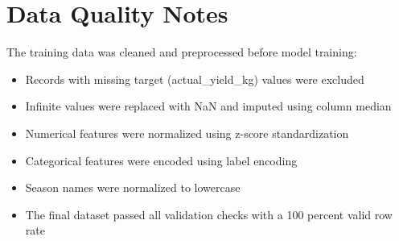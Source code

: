 \section{Data Quality Notes}

The training data was cleaned and preprocessed before model training:
\begin{itemize}
  \item Records with missing target (actual\_yield\_kg) values were excluded
  \item Infinite values were replaced with NaN and imputed using column median
  \item Numerical features were normalized using z-score standardization
  \item Categorical features were encoded using label encoding
  \item Season names were normalized to lowercase
  \item The final dataset passed all validation checks with a 100 percent valid row rate
\end{itemize}
